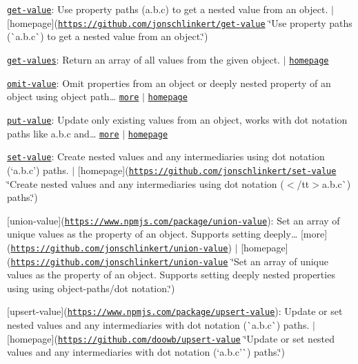 \begin{DoxyItemize}
\item \href{https://www.npmjs.com/package/get-value}{\tt get-\/value}\+: Use property paths ({\ttfamily a.\+b.\+c}) to get a nested value from an object. $\vert$ \mbox{[}homepage\mbox{]}(\href{https://github.com/jonschlinkert/get-value}{\tt https\+://github.\+com/jonschlinkert/get-\/value} \char`\"{}\+Use property paths (\`{}a.\+b.\+c\`{}) to get a nested value from an object.\char`\"{})
\item \href{https://www.npmjs.com/package/get-values}{\tt get-\/values}\+: Return an array of all values from the given object. $\vert$ \href{https://github.com/jonschlinkert/get-values}{\tt homepage}
\item \href{https://www.npmjs.com/package/omit-value}{\tt omit-\/value}\+: Omit properties from an object or deeply nested property of an object using object path… \href{https://github.com/jonschlinkert/omit-value}{\tt more} $\vert$ \href{https://github.com/jonschlinkert/omit-value}{\tt homepage}
\item \href{https://www.npmjs.com/package/put-value}{\tt put-\/value}\+: Update only existing values from an object, works with dot notation paths like {\ttfamily a.\+b.\+c} and… \href{https://github.com/tunnckocore/put-value#readme}{\tt more} $\vert$ \href{https://github.com/tunnckocore/put-value#readme}{\tt homepage}
\item \href{https://www.npmjs.com/package/set-value}{\tt set-\/value}\+: Create nested values and any intermediaries using dot notation (`\textquotesingle{}a.\+b.\+c'{\ttfamily ) paths. $\vert$ \mbox{[}homepage\mbox{]}(\href{https://github.com/jonschlinkert/set-value}{\tt https\+://github.\+com/jonschlinkert/set-\/value} \char`\"{}\+Create nested values and any intermediaries using dot notation ($<$/tt$>$\textquotesingle{}a.\+b.\+c\textquotesingle{}\`{}) paths.\char`\"{})}
\item {\ttfamily \mbox{[}union-\/value\mbox{]}(\href{https://www.npmjs.com/package/union-value}{\tt https\+://www.\+npmjs.\+com/package/union-\/value})\+: Set an array of unique values as the property of an object. Supports setting deeply… \mbox{[}more\mbox{]}(\href{https://github.com/jonschlinkert/union-value}{\tt https\+://github.\+com/jonschlinkert/union-\/value}) $\vert$ \mbox{[}homepage\mbox{]}(\href{https://github.com/jonschlinkert/union-value}{\tt https\+://github.\+com/jonschlinkert/union-\/value} \char`\"{}\+Set an array of unique values as the property of an object. Supports setting deeply nested properties using using object-\/paths/dot notation.\char`\"{})}
\item {\ttfamily \mbox{[}upsert-\/value\mbox{]}(\href{https://www.npmjs.com/package/upsert-value}{\tt https\+://www.\+npmjs.\+com/package/upsert-\/value})\+: Update or set nested values and any intermediaries with dot notation (\`{}\textquotesingle{}a.\+b.\+c\textquotesingle{}\`{}) paths. $\vert$ \mbox{[}homepage\mbox{]}(\href{https://github.com/doowb/upsert-value}{\tt https\+://github.\+com/doowb/upsert-\/value} \char`\"{}\+Update or set nested values and any intermediaries with dot notation (`\textquotesingle{}a.\+b.\+c'\`{}) paths.\char`\"{})}
\end{DoxyItemize}

